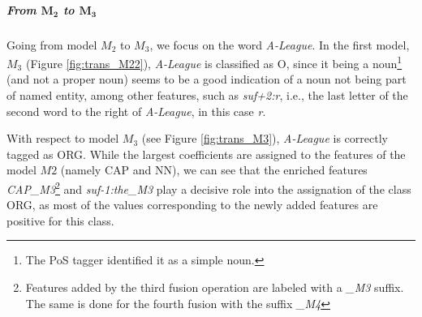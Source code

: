 \subparagraph{From $\mathbf{M_2}$ to $\mathbf{M_3}$} Going from model ${M_2}$ to ${M_3}$, we focus on the word \textit{A-League}. In the first model, $M_3$ (Figure \ref{fig:trans_M22}), \textit{A-League} is classified as O, since it being a  noun\footnote{The PoS tagger identified it as a simple noun.} (and not a proper noun) seems to be a good indication of a noun not being part of named entity, among other features, such as \textit{suf+2:r}, i.e., the last letter of the second word to the right of \textit{A-League}, in this case \textit{r}. 

With respect to model $M_3$ (see Figure \ref{fig:trans_M3}), \textit{A-League} is correctly tagged as ORG. While the largest coefficients are assigned to the features of the model $M2$ (namely CAP and NN), we can see that the enriched features \textit{CAP\_M3}\footnote{Features added by the third fusion operation are labeled with a \textit{\_M3} suffix. The same is done for the fourth fusion with the suffix \textit{\_M4}} and \textit{suf-1:the\_M3} play a decisive role into the assignation of the class ORG, as most of the values corresponding to the newly added features are positive for this class.



